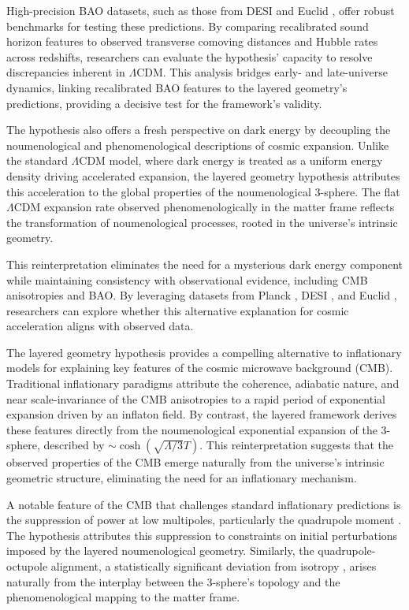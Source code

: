 \documentclass[aps,rmp,groupedaddress,twocolumn,10pt]{revtex4-2}
\begin{document}
High-precision BAO datasets, such as those from DESI \cite{Aghamousa2016} and Euclid \cite{Laureijs2011}, offer robust benchmarks for testing these predictions. By comparing recalibrated sound horizon features to observed transverse comoving distances and Hubble rates across redshifts, researchers can evaluate the hypothesis' capacity to resolve discrepancies inherent in $\Lambda$CDM. This analysis bridges early- and late-universe dynamics, linking recalibrated BAO features to the layered geometry's predictions, providing a decisive test for the framework's validity.

The hypothesis also offers a fresh perspective on dark energy by decoupling the noumenological and phenomenological descriptions of cosmic expansion. Unlike the standard $\Lambda$CDM model, where dark energy is treated as a uniform energy density driving accelerated expansion, the layered geometry hypothesis attributes this acceleration to the global properties of the noumenological 3-sphere. The flat $\Lambda$CDM expansion rate observed phenomenologically in the matter frame reflects the transformation of noumenological processes, rooted in the universe's intrinsic geometry.

This reinterpretation eliminates the need for a mysterious dark energy component while maintaining consistency with observational evidence, including CMB anisotropies and BAO. By leveraging datasets from Planck \cite{Aghanim2020}, DESI \cite{Aghamousa2016}, and Euclid \cite{Laureijs2011}, researchers can explore whether this alternative explanation for cosmic acceleration aligns with observed data.

The layered geometry hypothesis provides a compelling alternative to inflationary models for explaining key features of the cosmic microwave background (CMB). Traditional inflationary paradigms attribute the coherence, adiabatic nature, and near scale-invariance of the CMB anisotropies to a rapid period of exponential expansion driven by an inflaton field. By contrast, the layered framework derives these features directly from the noumenological exponential expansion of the 3-sphere, described by $\sim \cosh(\sqrt{\Lambda/3}T)$. This reinterpretation suggests that the observed properties of the CMB emerge naturally from the universe's intrinsic geometric structure, eliminating the need for an inflationary mechanism.

A notable feature of the CMB that challenges standard inflationary predictions is the suppression of power at low multipoles, particularly the quadrupole moment \cite{Komatsu2011, Aghanim2020}. The hypothesis attributes this suppression to constraints on initial perturbations imposed by the layered noumenological geometry. Similarly, the quadrupole-octupole alignment, a statistically significant deviation from isotropy \cite{Tegmark2003, Aghanim2020}, arises naturally from the interplay between the 3-sphere's topology and the phenomenological mapping to the matter frame.
\end{document}
